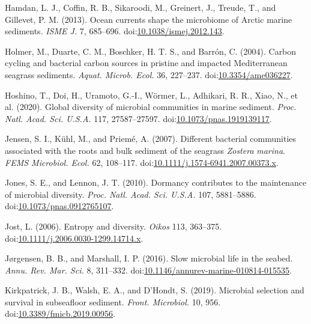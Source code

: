 \documentclass[12pt,]{article}
\begin{document}
\leavevmode\hypertarget{ref-Hamdan2013a}{}%
Hamdan, L. J., Coffin, R. B., Sikaroodi, M., Greinert, J., Treude, T.,
and Gillevet, P. M. (2013). Ocean currents shape the microbiome of
Arctic marine sediments. \emph{ISME J.} 7, 685--696.
doi:\href{https://doi.org/10.1038/ismej.2012.143}{10.1038/ismej.2012.143}.

\leavevmode\hypertarget{ref-Holmer2004d}{}%
Holmer, M., Duarte, C. M., Boschker, H. T. S., and Barrón, C. (2004).
Carbon cycling and bacterial carbon sources in pristine and impacted
Mediterranean seagrass sediments. \emph{Aquat. Microb. Ecol.} 36,
227--237.
doi:\href{https://doi.org/10.3354/ame036227}{10.3354/ame036227}.

\leavevmode\hypertarget{ref-Hoshino2020}{}%
Hoshino, T., Doi, H., Uramoto, G.-I., Wörmer, L., Adhikari, R. R., Xiao,
N., et al. (2020). Global diversity of microbial communities in marine
sediment. \emph{Proc. Natl. Acad. Sci. U.S.A.} 117, 27587--27597.
doi:\href{https://doi.org/10.1073/pnas.1919139117}{10.1073/pnas.1919139117}.

\leavevmode\hypertarget{ref-Jensen2007a}{}%
Jensen, S. I., Kühl, M., and Priemé, A. (2007). Different bacterial
communities associated with the roots and bulk sediment of the seagrass
\emph{Zostera} \emph{marina}. \emph{FEMS Microbiol. Ecol.} 62, 108--117.
doi:\href{https://doi.org/10.1111/j.1574-6941.2007.00373.x}{10.1111/j.1574-6941.2007.00373.x}.

\leavevmode\hypertarget{ref-Jones2010}{}%
Jones, S. E., and Lennon, J. T. (2010). Dormancy contributes to the
maintenance of microbial diversity. \emph{Proc. Natl. Acad. Sci. U.S.A.}
107, 5881--5886.
doi:\href{https://doi.org/10.1073/pnas.0912765107}{10.1073/pnas.0912765107}.

\leavevmode\hypertarget{ref-Jost2006}{}%
Jost, L. (2006). Entropy and diversity. \emph{Oikos} 113, 363--375.
doi:\href{https://doi.org/10.1111/j.2006.0030-1299.14714.x}{10.1111/j.2006.0030-1299.14714.x}.

\leavevmode\hypertarget{ref-Jorgensen2016}{}%
Jørgensen, B. B., and Marshall, I. P. (2016). Slow microbial life in the
seabed. \emph{Annu. Rev. Mar. Sci.} 8, 311--332.
doi:\href{https://doi.org/10.1146/annurev-marine-010814-015535}{10.1146/annurev-marine-010814-015535}.

\leavevmode\hypertarget{ref-Kirkpatrick2019}{}%
Kirkpatrick, J. B., Walsh, E. A., and D'Hondt, S. (2019). Microbial
selection and survival in subseafloor sediment. \emph{Front. Microbiol.}
10, 956.
doi:\href{https://doi.org/10.3389/fmicb.2019.00956}{10.3389/fmicb.2019.00956}.
\end{document}
